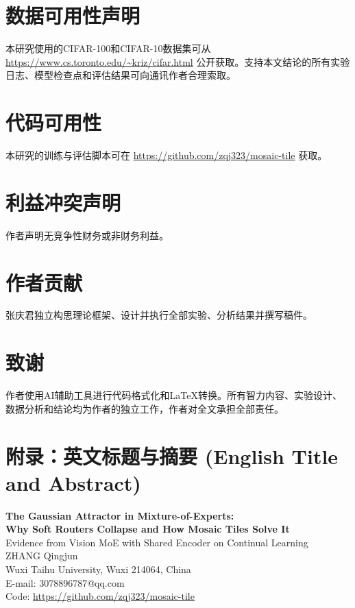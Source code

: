 \documentclass[twoside]{article}
\theoremstyle{definition}
\begin{document}
\section*{数据可用性声明}
本研究使用的CIFAR-100和CIFAR-10数据集可从 \url{https://www.cs.toronto.edu/~kriz/cifar.html} 公开获取。支持本文结论的所有实验日志、模型检查点和评估结果可向通讯作者合理索取。

\section*{代码可用性}
本研究的训练与评估脚本可在 \url{https://github.com/zqj323/mosaic-tile} 获取。

\section*{利益冲突声明}
作者声明无竞争性财务或非财务利益。

\section*{作者贡献}
张庆君独立构思理论框架、设计并执行全部实验、分析结果并撰写稿件。

\section*{致谢}
作者使用AI辅助工具进行代码格式化和LaTeX转换。所有智力内容、实验设计、数据分析和结论均为作者的独立工作，作者对全文承担全部责任。

\vspace{12pt}



\newpage
\appendix
\section*{附录：英文标题与摘要 (English Title and Abstract)}

\begin{center}
{\bfseries{} The Gaussian Attractor in Mixture-of-Experts:\\Why Soft Routers Collapse and How Mosaic Tiles Solve It}\\[6pt]
{ Evidence from Vision MoE with Shared Encoder on Continual Learning}\\[8pt]
{ ZHANG Qingjun}\\[2pt]
{ Wuxi Taihu University, Wuxi 214064, China}\\[2pt]
{ E-mail: 3078896787@qq.com}\\[2pt]
{ Code: \url{https://github.com/zqj323/mosaic-tile}}
\end{center}
\end{document}

